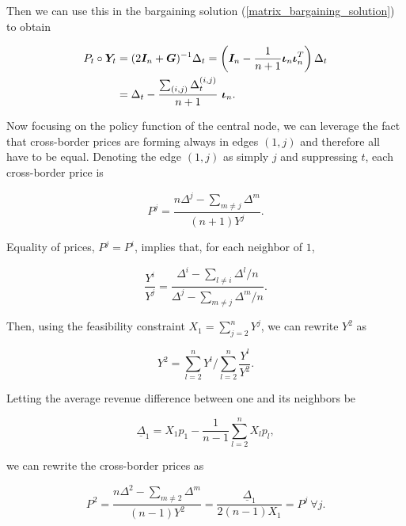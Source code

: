 Then we can use this in the bargaining solution (\ref{matrix_bargaining_solution}) to obtain

\begin{equation*}
  \begin{split}
    P_t \circ \Y_t &= (2\I_n + \G)^{-1} \Delta_t = \left( \I_n - \frac{1}{n + 1} \matr{\iota}_n \matr{\iota}_n^T \right) \Delta_t \\
    &= \Delta_t - \frac{\sum_{(i, j)} \Delta^{(i, j)}_t}{n+1} \ \matr{\iota}_n.
  \end{split}
\end{equation*}

Now focusing on the policy function of the central node, we can leverage the fact that cross-border prices are forming always in edges $(1, j)$ and therefore all have to be equal. Denoting the edge $(1, j)$ as simply $j$ and suppressing $t$, each cross-border price is

\begin{equation*}
  P^j = \frac{n\Delta^j - \sum_{m \neq j} \Delta^m }{(n + 1)Y^j}.
\end{equation*}

Equality of prices, $P^j = P^i$, implies that, for each neighbor of $1$,

\begin{equation*}
  \frac{Y^i}{Y^j} = \frac{\Delta^i - \sum_{l \neq i} \Delta^l / n}{\Delta^j - \sum_{m \neq j} \Delta^m / n}.
\end{equation*}

Then, using the feasibility constraint $X_1 = \sum^n_{j = 2} Y^j$, we can rewrite $Y^2$ as

\begin{equation*}
  Y^2 = \sum^n_{l = 2} Y^l \Big/ \sum^n_{l = 2} \frac{Y^l}{Y^2}.
\end{equation*}

Letting the average revenue difference between one and its neighbors be

\begin{equation*}
  \underline{\Delta}_1 = X_1 p_1 - \frac{1}{n-1} \sum^n_{l = 2} X_l p_l,
\end{equation*}

we can rewrite the cross-border prices as

\begin{equation*}
  P^2 = \frac{n \Delta^2 - \sum_{m \neq 2} \Delta^m}{(n-1) Y^2} = \frac{\underline{\Delta}_1}{2 (n-1) X_1} = P^j \ \forall j.
\end{equation*}

